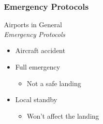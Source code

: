 \subsubsection{Emergency Protocols}
\begin{frame}{Airports in General\\\small\textit{Emergency Protocols}}{}
	\begin{itemize}
		\item Aircraft accident
		\item Full emergency
			\begin{itemize}
				\item Not a safe landing
			\end{itemize}
		\item Local standby
			\begin{itemize}
				\item Won't affect the landing
			\end{itemize}
	\end{itemize}
\end{frame}